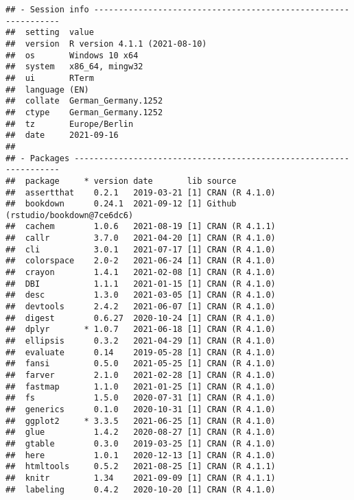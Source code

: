 \documentclass[
]{article}
\begin{document}
\begin{verbatim}
## - Session info ---------------------------------------------------------------
##  setting  value                       
##  version  R version 4.1.1 (2021-08-10)
##  os       Windows 10 x64              
##  system   x86_64, mingw32             
##  ui       RTerm                       
##  language (EN)                        
##  collate  German_Germany.1252         
##  ctype    German_Germany.1252         
##  tz       Europe/Berlin               
##  date     2021-09-16                  
## 
## - Packages -------------------------------------------------------------------
##  package     * version date       lib source                           
##  assertthat    0.2.1   2019-03-21 [1] CRAN (R 4.1.0)                   
##  bookdown      0.24.1  2021-09-12 [1] Github (rstudio/bookdown@7ce6dc6)
##  cachem        1.0.6   2021-08-19 [1] CRAN (R 4.1.1)                   
##  callr         3.7.0   2021-04-20 [1] CRAN (R 4.1.0)                   
##  cli           3.0.1   2021-07-17 [1] CRAN (R 4.1.0)                   
##  colorspace    2.0-2   2021-06-24 [1] CRAN (R 4.1.0)                   
##  crayon        1.4.1   2021-02-08 [1] CRAN (R 4.1.0)                   
##  DBI           1.1.1   2021-01-15 [1] CRAN (R 4.1.0)                   
##  desc          1.3.0   2021-03-05 [1] CRAN (R 4.1.0)                   
##  devtools      2.4.2   2021-06-07 [1] CRAN (R 4.1.0)                   
##  digest        0.6.27  2020-10-24 [1] CRAN (R 4.1.0)                   
##  dplyr       * 1.0.7   2021-06-18 [1] CRAN (R 4.1.0)                   
##  ellipsis      0.3.2   2021-04-29 [1] CRAN (R 4.1.0)                   
##  evaluate      0.14    2019-05-28 [1] CRAN (R 4.1.0)                   
##  fansi         0.5.0   2021-05-25 [1] CRAN (R 4.1.0)                   
##  farver        2.1.0   2021-02-28 [1] CRAN (R 4.1.0)                   
##  fastmap       1.1.0   2021-01-25 [1] CRAN (R 4.1.0)                   
##  fs            1.5.0   2020-07-31 [1] CRAN (R 4.1.0)                   
##  generics      0.1.0   2020-10-31 [1] CRAN (R 4.1.0)                   
##  ggplot2     * 3.3.5   2021-06-25 [1] CRAN (R 4.1.0)                   
##  glue          1.4.2   2020-08-27 [1] CRAN (R 4.1.0)                   
##  gtable        0.3.0   2019-03-25 [1] CRAN (R 4.1.0)                   
##  here          1.0.1   2020-12-13 [1] CRAN (R 4.1.0)                   
##  htmltools     0.5.2   2021-08-25 [1] CRAN (R 4.1.1)                   
##  knitr         1.34    2021-09-09 [1] CRAN (R 4.1.1)                   
##  labeling      0.4.2   2020-10-20 [1] CRAN (R 4.1.0)                   

\end{verbatim}
\end{document}
